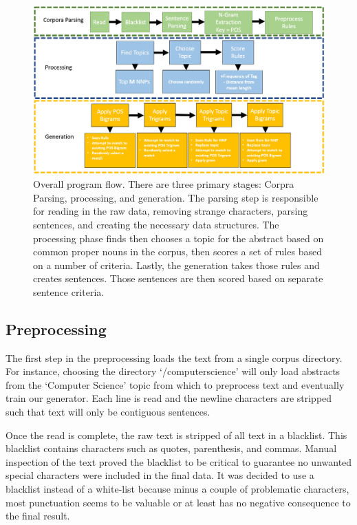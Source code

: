 \documentclass[letterpaper, 10 pt, conference]{ieeeconf}  %
\begin{document}
\begin{figure}[!ht]
	\centering
	\includegraphics[width=1\textwidth]{overall_flow}
	\caption{Overall program flow. There are three primary stages: Corpra Parsing, processing, and generation. The parsing step is responsible for reading in the raw data, removing strange characters, parsing sentences, and creating the necessary data structures. The processing phase finds then chooses a topic for the abstract based on common proper nouns in the corpus, then scores a set of rules based on a number of criteria. Lastly, the generation takes those rules and creates sentences. Those sentences are then scored based on separate sentence criteria.}
	\label{fig:SolutionOverview}
\end{figure}

\subsection{Preprocessing}

The first step in the preprocessing loads the text from a single corpus directory. For instance, choosing the directory ‘/computer\textunderscore science’ will only load abstracts from the ‘Computer Science’ topic from which to preprocess text and eventually train our generator. Each line is read and the newline characters are stripped such that text will only be contiguous sentences.

Once the read is complete, the raw text is stripped of all text in a blacklist. This blacklist contains characters such as quotes, parenthesis, and commas. Manual inspection of the text proved the blacklist to be critical to guarantee no unwanted special characters were included in the final data. It was decided to use a blacklist instead of a white-list because minus a couple of problematic characters, most punctuation seems to be valuable or at least has no negative consequence to the final result.
\end{document}

